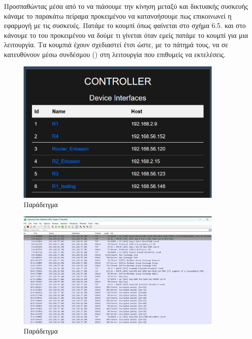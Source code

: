 Προσπαθώντας μέσα από το  να πιάσουμε την κίνηση μεταξύ
 και δικτυακής συσκευής κάναμε το παρακάτω πείραμα προκειμένου να κατανοήσουμε 
πως επικοινωνεί η εφαρμογή με τις συσκευές. Πατάμε το κουμπί  όπως φαίνεται στο σχήμα 6.5. και στο  κάνουμε 
το  του  προκειμένου να δούμε τι γίνεται όταν εμείς πατάμε
το κουμπί για μια λειτουργία. Τα κουμπιά έχουν σχεδιαστεί έτσι ώστε, με το πάτημά τους, να σε κατευθύνουν μέσω συνδέσμου () στη λειτουργία που επιθυμείς να εκτελέσεις.


\FloatBarrier

\begin{figure}[htb]
	\centering
	\includegraphics[width=0.9\textwidth]{graphics/r1_testing.png}
	\caption{Παράδειγμα  }
\end{figure}

\FloatBarrier




\begin{figure}[htb]
	\centering
	\includegraphics[width=0.9\textwidth]{graphics/wireshark.png}
	\caption{Παράδειγμα  }
\end{figure}

